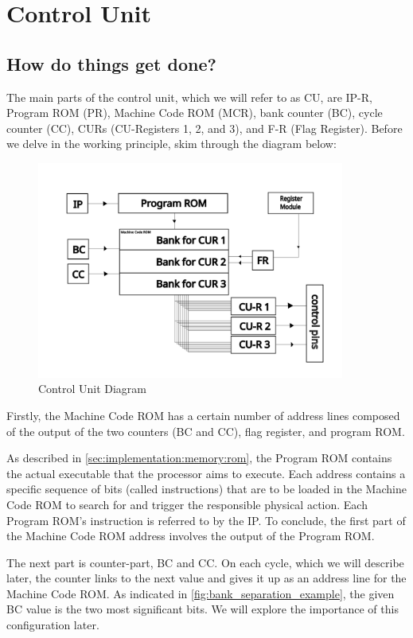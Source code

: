 \section{Control Unit} \label{sec:control_unit}
\subsection{How do things get done?} \label{sec:control_unit:working_principle}
The main parts of the control unit, which we will refer to as CU, are IP-R, Program ROM (PR), Machine Code ROM (MCR), bank counter (BC), cycle counter (CC), CURs (CU-Registers 1, 2, and 3), and F-R (Flag Register). Before we delve in the working principle, skim through the diagram below:

\begin{figure}[H]
	\centering
	\includegraphics[width=0.9\textwidth]{img/CU}
	\caption{Control Unit Diagram}
	\label{fig:cu_diagram}
\end{figure}

Firstly, the Machine Code ROM has a certain number of address lines composed of the output of the two counters (BC and CC), flag register, and program ROM. 

As described in \ref{sec:implementation:memory:rom}, the Program ROM contains the actual executable that the processor aims to execute. Each address contains a specific sequence of bits (called instructions) that are to be loaded in the Machine Code ROM to search for and trigger the responsible physical action. Each Program ROM's instruction is referred to by the IP. To conclude, the first part of the Machine Code ROM address involves the output of the Program ROM.

The next part is counter-part, BC and CC. On each cycle, which we will describe later, the counter links to the next value and gives it up as an address line for the Machine Code ROM. As indicated in \ref{fig:bank_separation_example}, the given BC value is the two most significant bits. We will explore the importance of this configuration later. 

